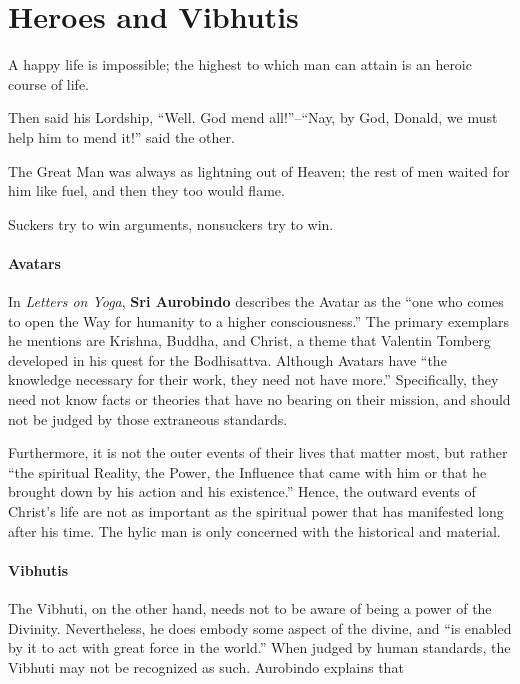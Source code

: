 \section{Heroes and Vibhutis}

\begin{quotex}
A happy life is impossible; the highest to which man can attain is an heroic course of life.

Then said his Lordship, ``Well. God mend all!''--``Nay, by God, Donald, we must help him to mend it!'' said the other.

The Great Man was always as lightning out of Heaven; the rest of men waited for him like fuel, and then they too would flame.

Suckers try to win arguments, nonsuckers try to win.
\end{quotex}


\paragraph{Avatars}


In \emph{Letters on Yoga}, \textbf{Sri Aurobindo} describes the Avatar as the ``one who comes to open the Way for humanity to a higher consciousness.'' The primary exemplars he mentions are Krishna, Buddha, and Christ, a theme that Valentin Tomberg developed in his quest for the Bodhisattva. Although Avatars have ``the knowledge necessary for their work, they need not have more.'' Specifically, they need not know facts or theories that have no bearing on their mission, and should not be judged by those extraneous standards.

Furthermore, it is not the outer events of their lives that matter most, but rather ``the spiritual Reality, the Power, the Influence that came with him or that he brought down by his action and his existence.'' Hence, the outward events of Christ's life are not as important as the spiritual power that has manifested long after his time. The hylic man is only concerned with the historical and material.

\paragraph{Vibhutis}


The Vibhuti, on the other hand, needs not to be aware of being a power of the Divinity. Nevertheless, he does embody some aspect of the divine, and ``is enabled by it to act with great force in the world.'' When judged by human standards, the Vibhuti may not be recognized as such. Aurobindo explains that

